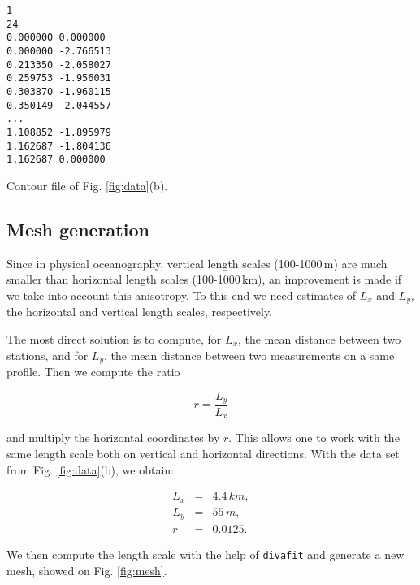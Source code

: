 \begin{exfile}
\begin{footnotesize}
\begin{verbatim}
1 
24 
0.000000 0.000000 
0.000000 -2.766513 
0.213350 -2.058027 
0.259753 -1.956031 
0.303870 -1.960115 
0.350149 -2.044557 
...
1.108852 -1.895979 
1.162687 -1.804136 
1.162687 0.000000 

\end{verbatim}
\end{footnotesize}
\caption{Contour file of Fig. \ref{fig:data}(b).\label{exfile:contour}}
\end{exfile}


\subsection{Mesh generation\label{sec:meshscale}}


Since in physical oceanography, vertical length scales (100-1000\,m) are much smaller than horizontal length scales (100-1000\,km), an improvement is  made if we take into account this anisotropy. To this end we need estimates of $L_{x}$ and $L_{y}$, the horizontal and vertical length scales, respectively.


The most direct solution is to compute, for $L_{x}$, the mean distance between two stations, and for $L_{y}$, the mean distance between two measurements on a same profile. Then we compute the ratio

\[r = \frac{L_y}{L_x}\]

and multiply the horizontal coordinates by $r$. This allows one to work with the same length scale both on vertical and horizontal directions. With the  data set from Fig. \ref{fig:data}(b), we obtain:

\begin{eqnarray*}
L_{x} &=& 4.4\,km,\\
L_{y} &=& 55\,m,\\
	r   &=& 0.0125.
\end{eqnarray*}




We then compute the length scale with the help of \texttt{divafit} and generate a new mesh, showed on Fig. \ref{fig:mesh}. 

